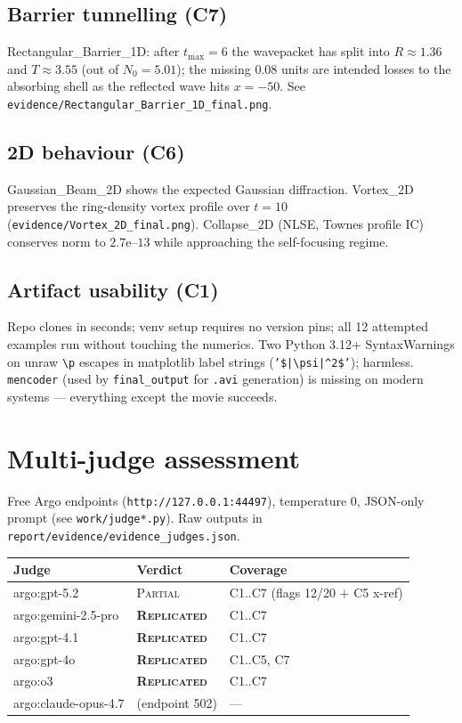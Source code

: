 \documentclass[11pt,a4paper]{article}
\begin{document}
\subsection{Barrier tunnelling (C7)}

Rectangular\_Barrier\_1D: after $t_{\max}=6$ the wavepacket has split
into $R \approx 1.36$ and $T\approx 3.55$ (out of $N_{0}=5.01$); the missing
$0.08$ units are intended losses to the absorbing shell as the reflected
wave hits $x=-50$. See \texttt{evidence/Rectangular\_Barrier\_1D\_final.png}.

\subsection{2D behaviour (C6)}

Gaussian\_Beam\_2D shows the expected Gaussian diffraction. Vortex\_2D
preserves the ring-density vortex profile over $t=10$
(\texttt{evidence/Vortex\_2D\_final.png}). Collapse\_2D (NLSE, Townes
profile IC) conserves norm to $2.7\text{e--}13$ while approaching the
self-focusing regime.

\subsection{Artifact usability (C1)}
\label{sec:usability}

Repo clones in seconds; venv setup requires no version pins;
all 12 attempted examples run without touching the numerics.
Two Python 3.12+ SyntaxWarnings on unraw \texttt{\textbackslash p} escapes
in matplotlib label strings (\texttt{'\$|\textbackslash psi|\textasciicircum 2\$'});
harmless. \texttt{mencoder} (used by \texttt{final\_output} for \texttt{.avi} generation)
is missing on modern systems --- everything except the movie succeeds.

\section{Multi-judge assessment}
\label{sec:judges}

Free Argo endpoints (\texttt{http://127.0.0.1:44497}), temperature 0,
JSON-only prompt (see \texttt{work/judge*.py}). Raw outputs in
\texttt{report/evidence/evidence\_judges.json}.

\begin{center}
\begin{tabular}{@{}l l l@{}}
\toprule
Judge & Verdict & Coverage \\
\midrule
argo:gpt-5.2         & \textsc{Partial}    & C1..C7 (flags 12/20 $+$ C5 x-ref) \\
argo:gemini-2.5-pro  & \textbf{\textsc{Replicated}} & C1..C7 \\
argo:gpt-4.1         & \textbf{\textsc{Replicated}} & C1..C7 \\
argo:gpt-4o          & \textbf{\textsc{Replicated}} & C1..C5, C7 \\
argo:o3              & \textbf{\textsc{Replicated}} & C1..C7 \\
argo:claude-opus-4.7 & (endpoint 502) & --- \\
\bottomrule
\end{tabular}
\end{center}
\end{document}

